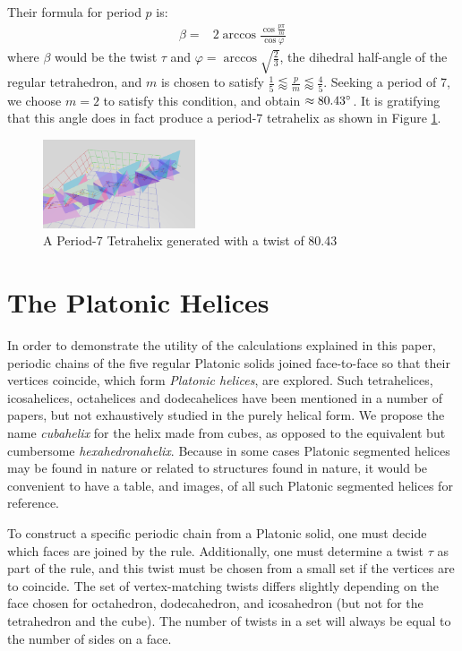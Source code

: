 \documentclass{svproc}
\begin{document}
Their formula for period $p$ is:
\begin{align}
  \beta =& 2 \arccos{\frac{\cos{\frac{p\pi}{m}}}{\cos{\varphi}}}
\end{align}
where $\beta$ would be the twist $\tau$ and $\varphi = \arccos{\sqrt{\frac{2}{3}}}$,
the dihedral half-angle of the regular tetrahedron, and $m$ is chosen to
satisfy $\frac{1}{5} \lessapprox \frac{p}{m} \lessapprox \frac{4}{5}$.
Seeking a period of 7, we choose $m = 2$ to satisfy this condition, and
obtain $\approx 80.43 \degree$. It is gratifying that this angle does
in fact produce a period-7 tetrahelix as shown in Figure \ref{fig:periodseven}.

\begin{figure}
     \centering
     \includegraphics[width=0.40\textwidth]{figures/Period7Tetrahelix.png}
     \caption{ A Period-7 Tetrahelix generated with a twist of 80.43\degree}
  \label{fig:periodseven}
\end{figure}

\section{The Platonic Helices}

\label{sec:platonic}

In order to demonstrate the utility of the calculations explained in this paper,
periodic chains of the five regular Platonic solids joined face-to-face so that their vertices coincide,
which form {\em Platonic helices}, are explored.
Such tetrahelices, icosahelices, octahelices and dodecahelices
have been mentioned in a number of papers\cite{elgersma2016quadrahelix,babiker2012combinatorial,lord2001sphere}, but not exhaustively studied in
the purely helical form.
We propose the name {\em cubahelix} for the helix made from cubes, as opposed to the equivalent
but cumbersome {\em hexahedronahelix}.
Because in some cases Platonic segmented helices may be found in nature or
related to structures found in nature\cite{lord2004gamma,pearce1990structure},
it would be convenient to have a table, and images, of all such Platonic segmented helices for reference.

To construct a specific periodic chain from a Platonic solid,
one must decide which faces are joined by the rule.
Additionally, one must determine a twist
$\tau$ as part of the rule, and this twist must be chosen from a small set if the vertices are to coincide.
The set of vertex-matching twists differs slightly depending on the face chosen for octahedron, dodecahedron, and icosahedron
(but not for the tetrahedron and the cube). The number of twists in a set will always be equal to the number of sides on a face.
\end{document}

